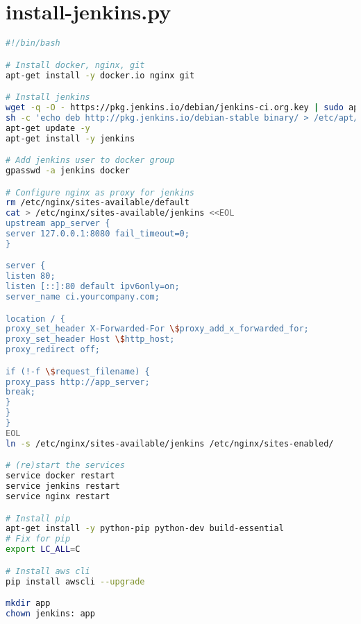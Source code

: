 \section{install-jenkins.py} \label{install-jenkins}

\begin{lstlisting}[language=bash]
#!/bin/bash

# Install docker, nginx, git
apt-get install -y docker.io nginx git

# Install jenkins
wget -q -O - https://pkg.jenkins.io/debian/jenkins-ci.org.key | sudo apt-key add -
sh -c 'echo deb http://pkg.jenkins.io/debian-stable binary/ > /etc/apt/sources.list.d/jenkins.list'
apt-get update -y
apt-get install -y jenkins

# Add jenkins user to docker group
gpasswd -a jenkins docker

# Configure nginx as proxy for jenkins
rm /etc/nginx/sites-available/default
cat > /etc/nginx/sites-available/jenkins <<EOL
upstream app_server {
server 127.0.0.1:8080 fail_timeout=0;
}

server {
listen 80;
listen [::]:80 default ipv6only=on;
server_name ci.yourcompany.com;

location / {
proxy_set_header X-Forwarded-For \$proxy_add_x_forwarded_for;
proxy_set_header Host \$http_host;
proxy_redirect off;

if (!-f \$request_filename) {
proxy_pass http://app_server;
break;
}
}
}
EOL
ln -s /etc/nginx/sites-available/jenkins /etc/nginx/sites-enabled/

# (re)start the services
service docker restart
service jenkins restart
service nginx restart

# Install pip
apt-get install -y python-pip python-dev build-essential
# Fix for pip
export LC_ALL=C

# Install aws cli
pip install awscli --upgrade

mkdir app
chown jenkins: app
\end{lstlisting}